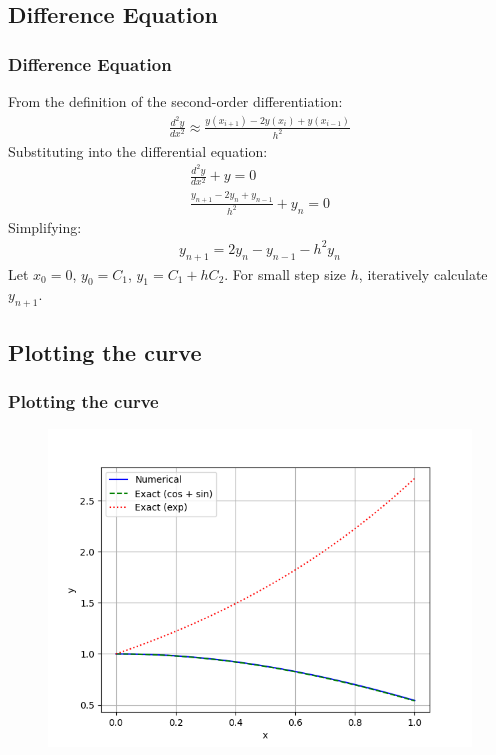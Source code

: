 \documentclass{beamer}
\theoremstyle{remark}
\numberwithin{equation}{section}
\begin{document}
	\subsection{Difference Equation}
	\begin{frame}
		\frametitle{Difference Equation}
		From the definition of the second-order differentiation:
		\begin{align}
			\frac{d^2y}{dx^2} \approx \frac{y(x_{i+1}) - 2y(x_i) + y(x_{i-1})}{h^2}
		\end{align}
		Substituting into the differential equation:
		\begin{align}
			\frac{d^2y}{dx^2} + y = 0 \\
			\frac{y_{n+1} - 2y_n + y_{n-1}}{h^2} + y_n = 0
		\end{align}
		Simplifying:
		\begin{align}
			y_{n+1} = 2y_n - y_{n-1} - h^2y_n
		\end{align}
		Let \( x_0 = 0 \), \( y_0 = C_1 \), \( y_1 = C_1 + hC_2 \). For small step size \( h \), iteratively calculate \( y_{n+1} \).\\
	\end{frame}
	
	
	\subsection{Plotting the curve}
	\begin{frame}
		\frametitle{Plotting the curve}
		\begin{figure}[h]
			\includegraphics[scale=0.6]{fig.png}
			\centering
		\end{figure}
	\end{frame}
\end{document}

